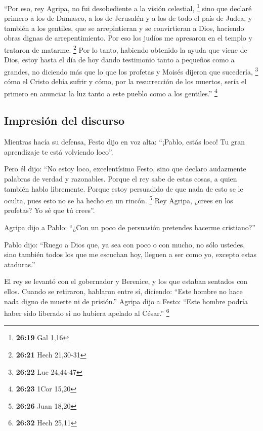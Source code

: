  ``Por eso, rey Agripa, no fui desobediente a la visión
celestial, \footnote{\textbf{26:19} Gal 1,16}  sino que
declaré primero a los de Damasco, a los de Jerusalén y a los de todo el
país de Judea, y también a los gentiles, que se arrepintieran y se
convirtieran a Dios, haciendo obras dignas de arrepentimiento.
 Por eso los judíos me apresaron en el templo y trataron
de matarme. \footnote{\textbf{26:21} Hech 21,30-31}  Por
lo tanto, habiendo obtenido la ayuda que viene de Dios, estoy hasta el
día de hoy dando testimonio tanto a pequeños como a grandes, no diciendo
más que lo que los profetas y Moisés dijeron que sucedería, \footnote{\textbf{26:22}
  Luc 24,44-47}  cómo el Cristo debía sufrir y cómo, por
la resurrección de los muertos, sería el primero en anunciar la luz
tanto a este pueblo como a los gentiles.'' \footnote{\textbf{26:23} 1Cor
  15,20}

\hypertarget{impresiuxf3n-del-discurso}{%
\subsection{Impresión del discurso}\label{impresiuxf3n-del-discurso}}

 Mientras hacía su defensa, Festo dijo en voz alta:
``¡Pablo, estás loco! Tu gran aprendizaje te está volviendo loco''.

 Pero él dijo: ``No estoy loco, excelentísimo Festo, sino
que declaro audazmente palabras de verdad y razonables. 
Porque el rey sabe de estas cosas, a quien también hablo libremente.
Porque estoy persuadido de que nada de esto se le oculta, pues esto no
se ha hecho en un rincón. \footnote{\textbf{26:26} Juan 18,20}
 Rey Agripa, ¿crees en los profetas? Yo sé que tú
crees''.

 Agripa dijo a Pablo: ``¿Con un poco de persuasión
pretendes hacerme cristiano?''

 Pablo dijo: ``Ruego a Dios que, ya sea con poco o con
mucho, no sólo ustedes, sino también todos los que me escuchan hoy,
lleguen a ser como yo, excepto estas ataduras.''

 El rey se levantó con el gobernador y Berenice, y los
que estaban sentados con ellos.  Cuando se retiraron,
hablaron entre sí, diciendo: ``Este hombre no hace nada digno de muerte
ni de prisión.''  Agripa dijo a Festo: ``Este hombre
podría haber sido liberado si no hubiera apelado al César.'' \footnote{\textbf{26:32}
  Hech 25,11}

